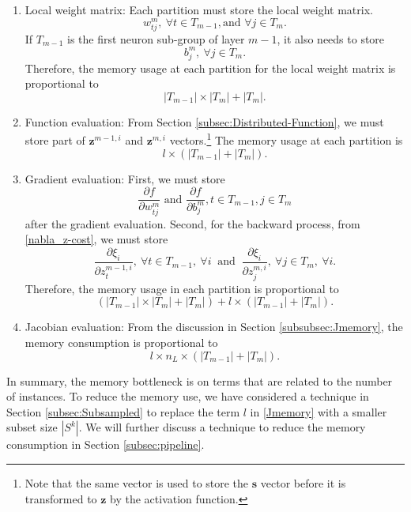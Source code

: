\documentclass[12pt]{article}
\def\bs{{\boldsymbol s}}
\def\bz{{\boldsymbol z}}
\begin{document}
\begin{enumerate}[1.]
\item Local weight matrix:
    Each partition must store the local weight matrix.
    \begin{equation*}
        w^m_{tj},\ \forall t \in T_{m-1}, \text{and } \forall j \in T_m.
    \end{equation*}
    If $T_{m-1}$ is the first neuron sub-group of layer $m-1$, it also needs to store
    \begin{equation*}
        b^m_{j},\ \forall j \in T_m.
    \end{equation*}
    Therefore, the memory usage at each partition for the local weight matrix is proportional to
    \begin{equation*}
        |T_{m-1}| \times |T_m| + |T_m|.
    \end{equation*}
\item Function evaluation: 
	From Section \ref{subsec:Distributed-Function}, we must store part of $\bz^{m-1,i}$ 
    and $\bz^{m,i}$ vectors.\footnote{Note that the same vector is used to store the $\bs$ vector before it is transformed to $\bz$ by the activation function.} The memory usage at each partition is
    \begin{equation}
	\label{memory-fun}
        l \times ( |T_{m-1}| + |T_m|).
    \end{equation}
\item Gradient evaluation:
    First, we must store 
    \begin{equation*}
			\frac{\partial f}{\partial w^m_{tj}} \text{ and } \frac{\partial f}{\partial b^m_j}, t \in T_{m-1}, j \in T_m
	\end{equation*}
	after the gradient evaluation.
    Second, for the backward process, from \eqref{nabla_z-cost}, we must store
	\begin{equation*}
	\frac{\partial \xi_i}{\partial z^{m-1,i}_t},\ \forall t \in T_{m-1},\ \forall i\ \text{ and }\ \frac{\partial \xi_i}{\partial z^{m,i}_j},\ \forall j \in T_m,\ \forall i. 
	\end{equation*}
    Therefore, the memory usage in each partition is proportional to
    \begin{equation}
	\label{memory-grad}
        (|T_{m-1}| \times |T_m| + |T_m|) + l \times ( |T_{m-1}| + |T_m|).
    \end{equation}
\item Jacobian evaluation:
    From the discussion in Section \ref{subsubsec:Jmemory}, the memory consumption is proportional to
    \begin{equation}
        \label{Jmemory}
        l \times n_L \times ( |T_{m-1}| + |T_m|).
    \end{equation}
\end{enumerate}
In summary, the memory bottleneck is on terms that are related to the number of instances.  
To reduce the memory use, we have considered a technique in Section \ref{subsec:Subsampled} to replace the term $l$ in \eqref{Jmemory} with a smaller subset size $|S^k|$. We will further discuss a technique to reduce the memory consumption in Section \ref{subsec:pipeline}.
\end{document}
